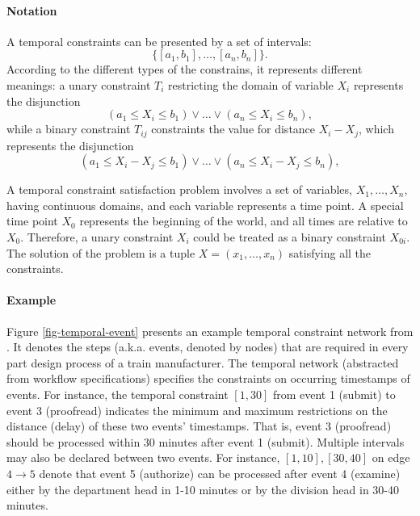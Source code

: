 \documentclass{article}
\begin{document}
\paragraph{Notation}
A temporal constraints can be presented by a set of intervals:
$$ \{[\mathit{a}_1, \mathit{b}_1], \dots, [\mathit{a}_n, \mathit{b}_n]\}. $$
According to the different types of the constrains, it represents different meanings:
a unary constraint $\mathit{T}_i$ restricting the domain of variable $\mathit{X}_i$ represents the disjunction
$$(\mathit{a}_1 \leq \mathit{X}_i \leq \mathit{b}_1) \vee \dots \vee (\mathit{a}_n \leq \mathit{X}_i \leq \mathit{b}_n),$$
while a binary constraint $\mathit{T}_{ij}$ constraints the value for distance $\mathit{X}_i - \mathit{X}_j$, which represents the disjunction
$$(\mathit{a}_1 \leq \mathit{X}_i - \mathit{X}_j \leq \mathit{b}_1) \vee \dots \vee (\mathit{a}_n \leq \mathit{X}_i - \mathit{X}_j \leq \mathit{b}_n),$$

A  temporal constraint satisfaction problem involves a set of variables, $\mathit{X}_1, \dots, \mathit{X}_n$,
having continuous domains, and each variable represents a time point.
A special time point $\mathit{X}_0$ represents the beginning of the world, and all times are relative to $\mathit{X}_0$.
Therefore, a unary constraint $\mathit{X}_i$ could be treated as a binary constraint $\mathit{X}_{0i}$.
The solution of the problem is a tuple $\mathit{X} = (\mathit{x}_1, \dots, \mathit{x}_n)$ satisfying all the constraints.

\paragraph{Example}

Figure \ref{fig-temporal-event} presents an example temporal constraint network from  \cite{DBLP:journals/pvldb/SongC016}. 
It denotes the steps (a.k.a. events, denoted by nodes) that are required in every part design process of a train manufacturer. 
The temporal network (abstracted from workflow specifications) specifies the constraints on occurring timestamps of events. 
For instance, the temporal constraint $[1,30]$ from event 1 (\textsf{submit}) to event 3 (\textsf{proofread}) indicates the minimum and maximum restrictions on the distance (delay) of these two events' timestamps. 
That is, event 3 (\textsf{proofread}) should be processed within 30 minutes after event 1 (\textsf{submit}).
%
Multiple intervals may also be declared between two events. 
For instance, $[1,10],[30,40]$ on edge $4\rightarrow5$ denote that event 5 (\textsf{authorize}) can be processed after event 4 (\textsf{examine}) either by the department head in 1-10 minutes or by the division head in 30-40 minutes. 
\end{document}
